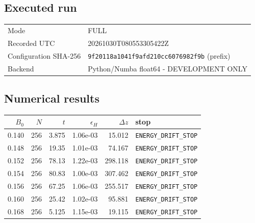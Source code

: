 \subsection*{Executed run}
\begin{tabular}{ll}\toprule
Mode & FULL\\
Recorded UTC & 20261030T080553305422Z\\
Configuration SHA-256 & \texttt{9f20118a1041f9afd210cc6076982f9b} (prefix)\\
Backend & Python/Numba float64 - DEVELOPMENT ONLY\\
\bottomrule\end{tabular}
\subsection*{Numerical results}
\begin{center}\small\begin{tabular}{rrrrrl}\toprule
$B_0$ & $N$ & $t$ & $\epsilon_H$ & $\Delta z$ & stop \\ \midrule
0.140 & 256 & 3.875 & 1.06e-03 & 15.012 & \texttt{ENERGY\_DRIFT\_STOP} \\
0.148 & 256 & 19.35 & 1.01e-03 & 74.167 & \texttt{ENERGY\_DRIFT\_STOP} \\
0.152 & 256 & 78.13 & 1.22e-03 & 298.118 & \texttt{ENERGY\_DRIFT\_STOP} \\
0.154 & 256 & 80.83 & 1.00e-03 & 307.462 & \texttt{ENERGY\_DRIFT\_STOP} \\
0.156 & 256 & 67.25 & 1.06e-03 & 255.517 & \texttt{ENERGY\_DRIFT\_STOP} \\
0.160 & 256 & 25.42 & 1.02e-03 & 95.881 & \texttt{ENERGY\_DRIFT\_STOP} \\
0.168 & 256 & 5.125 & 1.15e-03 & 19.115 & \texttt{ENERGY\_DRIFT\_STOP} \\
\bottomrule\end{tabular}\end{center}
